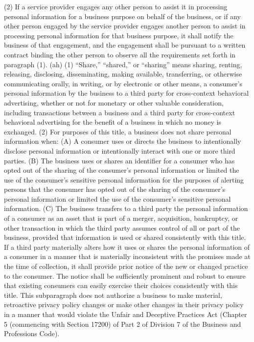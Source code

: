 (2) If a service provider engages any other person to assist it in processing personal information for a business purpose on behalf of the business, or if any other person engaged by the service provider engages another person to assist in processing personal information for that business purpose, it shall notify the business of that engagement, and the engagement shall be pursuant to a written contract binding the other person to observe all the requirements set forth in paragraph (1).
(ah) (1) “Share,” “shared,” or “sharing” means sharing, renting, releasing, disclosing, disseminating, making available, transferring, or otherwise communicating orally, in writing, or by electronic or other means, a consumer’s personal information by the business to a third party for cross-context behavioral advertising, whether or not for monetary or other valuable consideration, including transactions between a business and a third party for cross-context behavioral advertising for the benefit of a business in which no money is exchanged.
(2) For purposes of this title, a business does not share personal information when:
(A) A consumer uses or directs the business to intentionally disclose personal information or intentionally interact with one or more third parties.
(B) The business uses or shares an identifier for a consumer who has opted out of the sharing of the consumer’s personal information or limited the use of the consumer’s sensitive personal information for the purposes of alerting persons that the consumer has opted out of the sharing of the consumer’s personal information or limited the use of the consumer’s sensitive personal information.
(C) The business transfers to a third party the personal information of a consumer as an asset that is part of a merger, acquisition, bankruptcy, or other transaction in which the third party assumes control of all or part of the business, provided that information is used or shared consistently with this title. If a third party materially alters how it uses or shares the personal information of a consumer in a manner that is materially inconsistent with the promises made at the time of collection, it shall provide prior notice of the new or changed practice to the consumer. The notice shall be sufficiently prominent and robust to ensure that existing consumers can easily exercise their choices consistently with this title. This subparagraph does not authorize a business to make material, retroactive privacy policy changes or make other changes in their privacy policy in a manner that would violate the Unfair and Deceptive Practices Act (Chapter 5 (commencing with Section 17200) of Part 2 of Division 7 of the Business and Professions Code).
